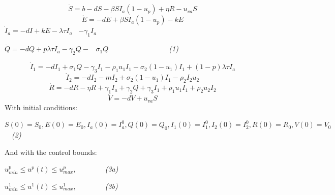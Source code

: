 \documentclass[a4paper]{article}
\begin{document}
\bigskip

\begin{equation*}
\dot S=b-\mathit{dS}-\mathit{\beta S}I_a\left(1-u_p\right)+\mathit{\eta R}-u_{\mathit{va}}S
\end{equation*}
\begin{equation*}
\dot E=-\mathit{dE}+\mathit{\beta S}I_a\left(1-u_p\right)-\mathit{kE}
\end{equation*}
 $\dot I_a=-\mathit{dI}+\mathit{kE}-\mathit{\lambda \tau }I_a$\textcolor[rgb]{0.07450981,0.078431375,0.07450981}{\ }
$-\gamma _1I_a$

 $\dot Q=-\mathit{dQ}+\mathit{p\lambda \tau }I_a-\gamma _2Q-$\textcolor[rgb]{0.07450981,0.078431375,0.07450981}{\ }
$\sigma _1Q$\ \ \ \ \ \ \ \ \ \ \ \ \ \ \ \  \ \textit{(1)}

\begin{equation*}
\dot I_1=-dI_1+\sigma _1Q-\gamma _3I_1-\rho _1u_1I_1-\sigma _2\left(1-u_1\right)I_1+\left(1-p\right)\mathit{\lambda \tau
}I_a
\end{equation*}
\begin{equation*}
\dot I_2=-dI_2-mI_2+\sigma _2\left(1-u_1\right)I_1-\rho _2I_2u_2
\end{equation*}
\begin{equation*}
\dot R=-\mathit{dR}-\mathit{\eta R}+\gamma _1I_a+\gamma _2Q+\gamma _3I_1+\rho _1u_1I_1+\rho _2u_2I_2
\end{equation*}
\begin{equation*}
\dot V=-\mathit{dV}+u_{\mathit{va}}S
\end{equation*}
\textcolor[rgb]{0.07450981,0.078431375,0.07450981}{With initial conditions: }


$S\left(0\right)=S_0,E\left(0\right)=E_0,I_a\left(0\right)=I_a^0,Q\left(0\right)=Q_0,I_1\left(0\right)=I_1^0,I_2\left(0\right)=I_2^0,R\left(0\right)=R_0,V\left(0\right)=V_0$\textcolor[rgb]{0.07450981,0.078431375,0.07450981}{\ \ }\textit{\textcolor[rgb]{0.07450981,0.078431375,0.07450981}{(2)}}

\textcolor[rgb]{0.07450981,0.078431375,0.07450981}{And with the control bounds:}


$u_{\mathit{min}}^p{\leq}u^p\left(t\right){\leq}u_{\mathit{max}}^p,$\textcolor[rgb]{0.07450981,0.078431375,0.07450981}{\ \ \ \ \ \ \ \ }\textit{\textcolor[rgb]{0.07450981,0.078431375,0.07450981}{(3a)}}


$u_{\mathit{min}}^1{\leq}u^1\left(t\right){\leq}u_{\mathit{max}}^1,$\textcolor[rgb]{0.07450981,0.078431375,0.07450981}{\ \ \ \ \ \ \ \ }\textit{\textcolor[rgb]{0.07450981,0.078431375,0.07450981}{(3b)}}
\end{document}
